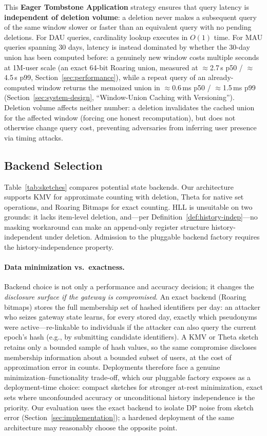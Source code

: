 \documentclass[sigconf,anonymous,review]{acmart}
\begin{document}
This \textbf{Eager Tombstone Application} strategy ensures that query latency is \textbf{independent of deletion volume}: a deletion never makes a subsequent query of the same window slower or faster than an equivalent query with no pending deletions. For DAU queries, cardinality lookup executes in $O(1)$ time. For MAU queries spanning 30 days, latency is instead dominated by whether the 30-day union has been computed before: a genuinely new window costs multiple seconds at 1M-user scale (an exact 64-bit Roaring union, measured at $\approx$2.7\,s p50 / $\approx$4.5\,s p99, Section~\ref{sec:performance}), while a repeat query of an already-computed window returns the memoized union in $\approx$0.6\,ms p50 / $\approx$1.5\,ms p99 (Section~\ref{sec:system-design}, ``Window-Union Caching with Versioning''). Deletion volume affects neither number: a deletion invalidates the cached union for the affected window (forcing one honest recomputation), but does not otherwise change query cost, preventing adversaries from inferring user presence via timing attacks.

\subsection{Backend Selection}
\label{sec:backend-selection}
Table~\ref{tab:sketches} compares potential state backends. Our architecture supports KMV for approximate counting with deletion, Theta for native set operations, and Roaring Bitmaps for exact counting. HLL is unsuitable on two grounds: it lacks item-level deletion, and---per Definition~\ref{def:history-indep}---no masking workaround can make an append-only register structure history-independent under deletion. Admission to the pluggable backend factory requires the history-independence property.

\paragraph{Data minimization vs.\ exactness.} Backend choice is not only a performance and accuracy decision; it changes the \emph{disclosure surface if the gateway is compromised}. An exact backend (Roaring bitmaps) stores the full membership set of hashed identifiers per day: an attacker who seizes gateway state learns, for every stored day, exactly which pseudonyms were active---re-linkable to individuals if the attacker can also query the current epoch's hash (e.g., by submitting candidate identifiers). A KMV or Theta sketch retains only a bounded sample of hash values, so the same compromise discloses membership information about a bounded subset of users, at the cost of approximation error in counts. Deployments therefore face a genuine minimization--functionality trade-off, which our pluggable factory exposes as a deployment-time choice: compact sketches for stronger at-rest minimization, exact sets where unconfounded accuracy or unconditional history independence is the priority. Our evaluation uses the exact backend to isolate DP noise from sketch error (Section~\ref{sec:implementation}); a hardened deployment of the same architecture may reasonably choose the opposite point.
\end{document}
